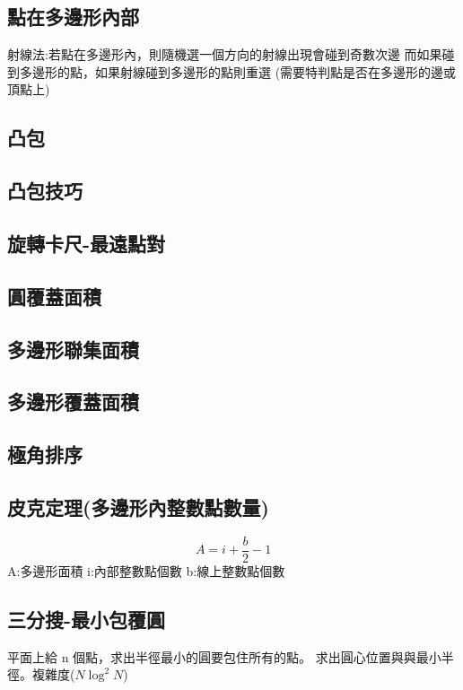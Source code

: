 \documentclass[a4paper,10pt,twocolumn,oneside]{article}
\begin{document}
\subsection{點在多邊形內部}
射線法:若點在多邊形內，則隨機選一個方向的射線出現會碰到奇數次邊
而如果碰到多邊形的點，如果射線碰到多邊形的點則重選
(需要特判點是否在多邊形的邊或頂點上)

\subsection{凸包}

\subsection{凸包技巧}


\subsection{旋轉卡尺-最遠點對}


\subsection{圓覆蓋面積}

\subsection{多邊形聯集面積}

\subsection{多邊形覆蓋面積}


\subsection{極角排序}


\subsection{皮克定理(多邊形內整數點數量)}
\[ A = i + \frac{b}{2} - 1 \]
A:多邊形面積
i:內部整數點個數
b:線上整數點個數

\subsection{三分搜-最小包覆圓}
平面上給 n 個點，求出半徑最小的圓要包住所有的點。
求出圓心位置與與最小半徑。複雜度($N{\log}^2{N}$)

\end{document}
